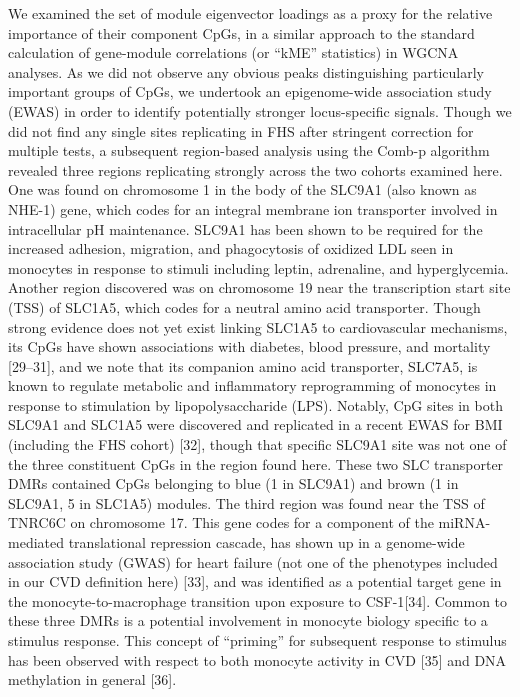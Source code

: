 \documentclass[]{article}
\theoremstyle{definition}
\theoremstyle{definition}
\theoremstyle{definition}
\theoremstyle{remark}
\begin{document}
We examined the set of module eigenvector loadings as a proxy for the
relative importance of their component CpGs, in a similar approach to
the standard calculation of gene-module correlations (or ``kME''
statistics) in WGCNA analyses. As we did not observe any obvious peaks
distinguishing particularly important groups of CpGs, we undertook an
epigenome-wide association study (EWAS) in order to identify potentially
stronger locus-specific signals. Though we did not find any single sites
replicating in FHS after stringent correction for multiple tests, a
subsequent region-based analysis using the Comb-p algorithm revealed
three regions replicating strongly across the two cohorts examined here.
One was found on chromosome 1 in the body of the SLC9A1 (also known as
NHE-1) gene, which codes for an integral membrane ion transporter
involved in intracellular pH maintenance. SLC9A1 has been shown to be
required for the increased adhesion, migration, and phagocytosis of
oxidized LDL seen in monocytes in response to stimuli including leptin,
adrenaline, and hyperglycemia. Another region discovered was on
chromosome 19 near the transcription start site (TSS) of SLC1A5, which
codes for a neutral amino acid transporter. Though strong evidence does
not yet exist linking SLC1A5 to cardiovascular mechanisms, its CpGs have
shown associations with diabetes, blood pressure, and mortality
{[}29--31{]}, and we note that its companion amino acid transporter,
SLC7A5, is known to regulate metabolic and inflammatory reprogramming of
monocytes in response to stimulation by lipopolysaccharide (LPS).
Notably, CpG sites in both SLC9A1 and SLC1A5 were discovered and
replicated in a recent EWAS for BMI (including the FHS cohort) {[}32{]},
though that specific SLC9A1 site was not one of the three constituent
CpGs in the region found here. These two SLC transporter DMRs contained
CpGs belonging to blue (1 in SLC9A1) and brown (1 in SLC9A1, 5 in
SLC1A5) modules. The third region was found near the TSS of TNRC6C on
chromosome 17. This gene codes for a component of the miRNA-mediated
translational repression cascade, has shown up in a genome-wide
association study (GWAS) for heart failure (not one of the phenotypes
included in our CVD definition here) {[}33{]}, and was identified as a
potential target gene in the monocyte-to-macrophage transition upon
exposure to CSF-1{[}34{]}. Common to these three DMRs is a potential
involvement in monocyte biology specific to a stimulus response. This
concept of ``priming'' for subsequent response to stimulus has been
observed with respect to both monocyte activity in CVD {[}35{]} and DNA
methylation in general {[}36{]}.
\end{document}
